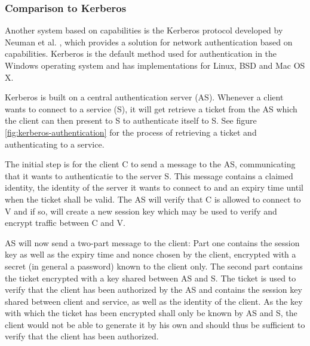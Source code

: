 \subsubsection{Comparison to Kerberos}
\label{sec:kerberos}

Another system based on capabilities is the Kerberos protocol developed by Neuman et al. \cite{neuman1994kerberos,neuman2005rfc}, which provides a solution for network authentication based on capabilities.
Kerberos is the default method used for authentication in the Windows operating system and has implementations for Linux, BSD and Mac OS X.

Kerberos is built on a central authentication server (AS).
Whenever a client wants to connect to a service (S), it will get retrieve a ticket from the AS which the client can then present to S to authenticate itself to S.
See figure \ref{fig:kerberos-authentication} for the process of retrieving a ticket and authenticating to a service.

The initial step is for the client C to send a message to the AS, communicating that it wants to authenticatie to the server S.
This message contains a claimed identity, the identity of the server it wants to connect to and an expiry time until when the ticket shall be valid.
The AS will verify that C is allowed to connect to V and if so, will create a new session key which may be used to verify and encrypt traffic between C and V.

AS will now send a two-part message to the client:
Part one contains the session key as well as the expiry time and nonce chosen by the client, encrypted with a secret (in general a password) known to the client only.
The second part contains the ticket encrypted with a key shared between AS and S.
The ticket is used to verify that the client has been authorized by the AS and contains the session key shared between client and service, as well as the identity of the client.
As the key with which the ticket has been encrypted shall only be known by AS and S, the client would not be able to generate it by his own and should thus be sufficient to verify that the client has been authorized.

